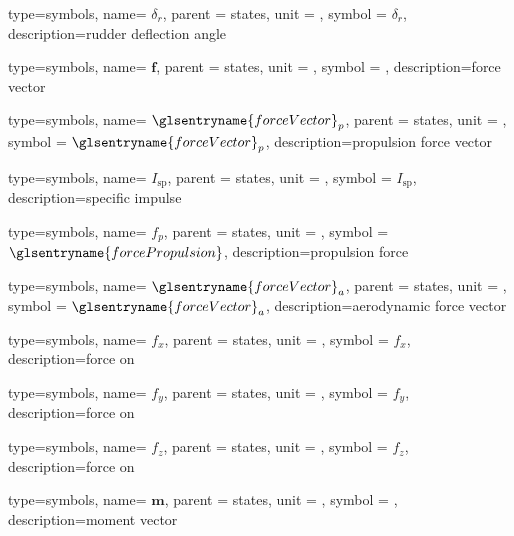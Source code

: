 {type=symbols,
  name= \ensuremath{\delta_{r}},
  parent = {states},
  unit = \unexpanded{\si{\degree}},
  symbol = \ensuremath{\delta_{r}},
  description={rudder deflection angle}
}

{type=symbols,
  name= \ensuremath{\mathbf{f}},
  parent = {states},
  unit = \unexpanded{\si{\newton}},
  symbol = ,
  description={force vector}
}

{type=symbols,
  name= \ensuremath{{\glsentryname{forceVector}}_{p}},
  parent = {states},
  unit = \unexpanded{\si{\newton}},
  symbol = \ensuremath{{\glsentryname{forceVector}}_{p}},
  description={propulsion force vector}
}

{type=symbols,
  name= \ensuremath{I_\textrm{sp}},
  parent = {states},
  unit = \unexpanded{\si{\second}},
  symbol = \ensuremath{I_\textrm{sp}},
  description={specific impulse}
}


{type=symbols,
  name= \ensuremath{f_{p}},
  parent = {states},
  unit = \unexpanded{\si{\newton}},
  symbol = \ensuremath{\glsentryname{forcePropulsion}},
  description={propulsion force}
}


{type=symbols,
  name= \ensuremath{{\glsentryname{forceVector}}_{a}},
  parent = {states},
  unit = \unexpanded{},
  symbol = \ensuremath{{\glsentryname{forceVector}}_{a}},
  description={aerodynamic force vector}
}

{type=symbols,
  name= \ensuremath{f_{x}},
  parent = {states},
  unit = \unexpanded{\si{\newton}},
  symbol = \ensuremath{f_{x}},
  description={force on }
}

{type=symbols,
  name= \ensuremath{f_{y}},
  parent = {states},
  unit = \unexpanded{\si{\newton}},
  symbol = \ensuremath{f_{y}},
  description={force on }
}

{type=symbols,
  name= \ensuremath{f_{z}},
  parent = {states},
  unit = \unexpanded{\si{\newton}},
  symbol = \ensuremath{f_{z}},
  description={force on }
}


{type=symbols,
  name= \ensuremath{\mathbf{m}},
  parent = {states},
  unit = \unexpanded{},
  symbol = ,
  description={moment vector}
}

